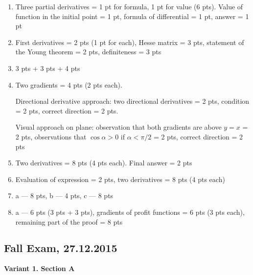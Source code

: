 \begin{enumerate}
\item Three partial derivatives = 1 pt for formula, 1 pt for value (6 pts). Value of function in the initial point = 1 pt, formula of differential = 1 pt, answer = 1 pt
\item First derivatives =  2 pts (1 pt for each), Hesse matrix = 3 pts, statement of the Young theorem = 2 pts, definiteness = 3 pts
\item 3 pts + 3 pts + 4 pts
\item Two gradients = 4 pts (2 pts each).

Directional derivative approach: two directional derivatives = 2 pts, condition = 2 pts, correct direction = 2 pts.

Visual approach on plane: observation that both gradients are above $y=x$ = 2 pts, observations that $\cos \alpha >0 $ if $\alpha < \pi/2$ = 2 pts, correct direction = 2 pts

\item Two derivatives = 8 pts (4 pts each). Final answer = 2 pts
\item Evaluation of expression = 2 pts, two derivatives = 8 pts (4 pts each)
\item a --- 8 pts, b --- 4 pts, c --- 8 pts
\item a --- 6 pts (3 pts + 3 pts), gradients of profit functions = 6 pts (3 pts each), remaining part of the proof = 8 pts
\end{enumerate}


\subsection{Fall Exam, 27.12.2015}

\textbf{Variant 1. Section A}


